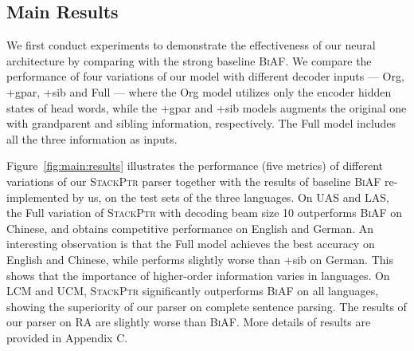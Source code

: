 \documentclass[11pt,a4paper]{article}
\begin{document}
\subsection{Main Results}
We first conduct experiments to demonstrate the effectiveness of our neural architecture by comparing with the strong baseline \textsc{BiAF}. 
We compare the performance of four variations of our model with different decoder inputs --- \textsf{Org}, \textsf{+gpar}, \textsf{+sib} and \textsf{Full} --- where 
the \textsf{Org} model utilizes only the encoder hidden states of head words, while the \textsf{+gpar} and \textsf{+sib} models augments the original one with grandparent and sibling information, respectively. 
The \textsf{Full} model includes all the three information as inputs.

Figure~\ref{fig:main:results} illustrates the performance (five metrics) of different variations of our \textsc{StackPtr} parser together with the results of baseline \textsc{BiAF} re-implemented by us, on the test sets of the three languages. 
On UAS and LAS, the \textsf{Full} variation of \textsc{StackPtr} with decoding beam size 10 outperforms \textsc{BiAF} on Chinese, and obtains competitive performance on English and German. An interesting observation is that the \textsf{Full} model achieves the best accuracy on English and Chinese, while performs slightly worse than \textsf{+sib} on German. 
This shows that the importance of higher-order information varies in languages.
On LCM and UCM, \textsc{StackPtr} significantly outperforms \textsc{BiAF} on all languages, showing the superiority of our parser on complete sentence parsing. 
The results of our parser on RA are slightly worse than \textsc{BiAF}.
More details of results are provided in Appendix C.
\end{document}
